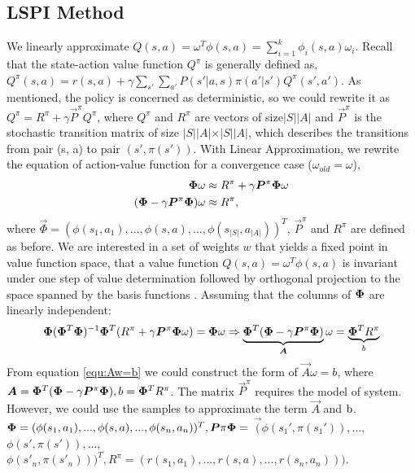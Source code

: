 \subsection{LSPI Method}
We linearly approximate $Q(s, a) = \omega^T \phi (s, a) = \sum_{i=1}^k \phi_i (s, a) \omega_i $. Recall that the state-action value function $Q^\pi$ is generally defined as, $Q^\pi(s, a) = r(s, a) + \gamma \sum_{s'} \sum_{a'} P(s' \vert a, s) \pi(a' \vert s') Q^\pi(s', a')$. As mentioned, the policy is concerned as deterministic, so we could rewrite it as 
$Q^\pi = R^\pi + \gamma \vec{P}^\pi Q^\pi$, where $Q^\pi$ and $R^\pi$ are vectors of size$\vert S \vert \vert A \vert$ and $\vec{P}^\pi$ is the stochastic transition matrix of size $\vert S \vert \vert A \vert \times \vert S \vert \vert A \vert$, which describes the transitions from pair (s, a) to pair $(s', \pi (s') )$.  With Linear Approximation, we rewrite the equation of action-value function for a convergence case ($\omega_{old} = \omega$), \\
\begin{align}
\vec \Phi \omega &\approx R^\pi + \gamma \vec{P}^\pi \vecPhi \omega\\
(\vec \Phi - \gamma \vec{P}^\pi \vecPhi) \omega &\approx R^\pi ,
\end{align}
where $\vec \Phi = ( \phi(s_1, a_1), ..., \phi(s, a), ..., \phi(s_{\vert S \vert}, a_{\vert A \vert}))^T$, $\vec P^\pi$ and $R^\pi$ are defined as before. We are interested in a set of weights $w$ that yields a fixed point in value function space, that a value function $Q(s, a) = \omega^T \phi (s, a)$ is invariant under one step of value determination followed by orthogonal projection to the space spanned by the basis functions \cite{lagoudakis2003least}. Assuming that the columns of $\vecPhi$ are linearly independent:
\begin{align}
\vecPhi ( \vecPhi^T \vecPhi)^{-1}\vecPhi^T (R^\pi + \gamma \vec{P} ^{\pi}\vecPhi \omega) = \vecPhi \omega \Rightarrow \underbrace{\vecPhi^T (\vec \Phi - \gamma \vec{P}^\pi \vecPhi)}_{\vec A} \omega = \underbrace{\vecPhi^T R^\pi}_b \label{equ:Aw=b}
\end{align}
From equation \eqref{equ:Aw=b} we could construct the form of $\vec A \omega = {b}$, where $\vec{A} =\vecPhi^T (\vec \Phi - \gamma \vec{P}^\pi \vecPhi), {b} = \vecPhi^T R^\pi$. The matrix $\vec{P}^\pi$ requires the model of system. However, we could use the samples to approximate the term $\vec{A}$ and ${\rm b}$. $\vec{\Phi}= ( \phi(s_1, a_1), ..., \phi(s, a), ..., \phi(s_n, a_n) )^T, \vec{P}\pi \vecPhi = $ $ \vec  ( \phi(s_1', \pi(s_1')), ..., $ $\phi(s', \pi(s')), ..., $ \\ $\phi(s'_{n}, \pi(s'_{n})))^T, R^\pi = (r(s_1, a_1), ..., r(s, a), ..., r(s_n, a_n)))$. 
